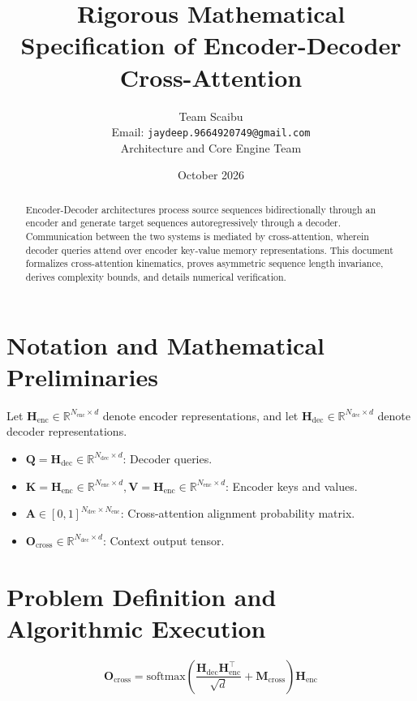 \documentclass[11pt,a4paper]{article}
\title{\textbf{Rigorous Mathematical Specification of Encoder-Decoder Cross-Attention}}
\author{Team Scaibu \\ \small Email: \texttt{jaydeep.9664920749@gmail.com} \\ \small Architecture and Core Engine Team}
\date{October 2026}
\theoremstyle{definition}
\begin{document}
\maketitle

\begin{abstract}
Encoder-Decoder architectures process source sequences bidirectionally through an encoder and generate target sequences autoregressively through a decoder. Communication between the two systems is mediated by cross-attention, wherein decoder queries attend over encoder key-value memory representations. This document formalizes cross-attention kinematics, proves asymmetric sequence length invariance, derives complexity bounds, and details numerical verification.
\end{abstract}

\section{Notation and Mathematical Preliminaries}

Let $\mathbf{H}_{\text{enc}} \in \mathbb{R}^{N_{\text{enc}} \times d}$ denote encoder representations, and let $\mathbf{H}_{\text{dec}} \in \mathbb{R}^{N_{\text{dec}} \times d}$ denote decoder representations.

\begin{itemize}
    \item $\mathbf{Q} = \mathbf{H}_{\text{dec}} \in \mathbb{R}^{N_{\text{dec}} \times d}$: Decoder queries.
    \item $\mathbf{K} = \mathbf{H}_{\text{enc}} \in \mathbb{R}^{N_{\text{enc}} \times d}, \mathbf{V} = \mathbf{H}_{\text{enc}} \in \mathbb{R}^{N_{\text{enc}} \times d}$: Encoder keys and values.
    \item $\mathbf{A} \in [0, 1]^{N_{\text{dec}} \times N_{\text{enc}}}$: Cross-attention alignment probability matrix.
    \item $\mathbf{O}_{\text{cross}} \in \mathbb{R}^{N_{\text{dec}} \times d}$: Context output tensor.
\end{itemize}

\section{Problem Definition and Algorithmic Execution}

\begin{equation}
\mathbf{O}_{\text{cross}} = \text{softmax}\left(\frac{\mathbf{H}_{\text{dec}} \mathbf{H}_{\text{enc}}^\top}{\sqrt{d}} + \mathbf{M}_{\text{cross}}\right) \mathbf{H}_{\text{enc}}
\end{equation}
\end{document}
